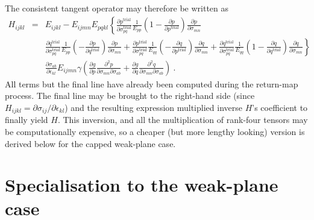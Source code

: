 \documentclass[]{scrreprt}
\begin{document}
The consistent tangent operator may therefore be written as
\begin{eqnarray}
H_{ijkl} & = & E_{ijkl} - E_{ijmn}E_{pqkl} \left\{
\frac{\partial
  p^{\mathrm{trial}}}{\partial\sigma_{pq}^{\mathrm{trial}}}
\frac{1}{E_{pp}}\left(1 - \frac{\partial p}{\partial
  p^{\mathrm{trial}}} \right) \frac{\partial p}{\partial\sigma_{mn}}
\right. \nonumber \\
&& \left.
\frac{\partial
  q^{\mathrm{trial}}}{\partial\sigma_{pq}^{\mathrm{trial}}}
\frac{1}{E_{pp}}\left( - \frac{\partial p}{\partial
  q^{\mathrm{trial}}} \right) \frac{\partial p}{\partial\sigma_{mn}}
+
\frac{\partial
  p^{\mathrm{trial}}}{\partial\sigma_{pq}^{\mathrm{trial}}}
\frac{1}{E_{qq}}\left(- \frac{\partial q}{\partial
  p^{\mathrm{trial}}} \right) \frac{\partial q}{\partial\sigma_{mn}}
+
\frac{\partial
  q^{\mathrm{trial}}}{\partial\sigma_{pq}^{\mathrm{trial}}}
\frac{1}{E_{qq}}\left(1 - \frac{\partial q}{\partial
  q^{\mathrm{trial}}} \right) \frac{\partial q}{\partial\sigma_{mn}}
\right\} \nonumber \\
&& \frac{\partial \sigma_{ab}}{\partial\epsilon_{kl}} E_{ijmn} \gamma
\left(
\frac{\partial g}{\partial p}\frac{\partial^{2}
  p}{\partial\sigma_{mn}\partial\sigma_{ab}}
+
\frac{\partial g}{\partial q}\frac{\partial^{2}
  q}{\partial\sigma_{mn}\partial\sigma_{ab}}
\right) \ .
\end{eqnarray}
All terms but the final line have already been computed during the
return-map process.  The final line may be brought to the right-hand
side (since $H_{ijkl} = \partial\sigma_{ij}/\partial\epsilon_{kl}$)
and the resulting expression multiplied inverse $H$'s coefficient to
finally yield $H$.  This inversion, and all the multiplication of
rank-four tensors may be computationally expensive, so a cheaper (but
more lengthy looking) version is derived below for the capped
weak-plane case.


\section{Specialisation to the weak-plane case}
\end{document}
